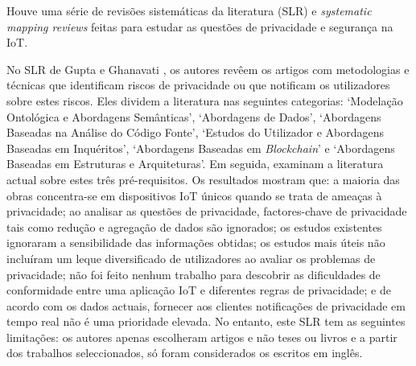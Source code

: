 \documentclass[conference]{IEEEtran}
\begin{document}
Houve uma série de revisões sistemáticas da literatura (SLR) \cite{Gupta2022Privacy, Kuhtreiber2022survey, sicari2015security, LinSurvey}
e \textit{systematic mapping reviews} \cite{porras2018security, ahmed2019aspects}
feitas para estudar as questões de privacidade e segurança na IoT.


No SLR de Gupta e Ghanavati \cite{Gupta2022Privacy}, os autores revêem os
artigos com metodologias e técnicas que identificam riscos de privacidade
ou que notificam os utilizadores sobre estes riscos. Eles dividem a literatura
nas seguintes categorias: `Modelação Ontológica e Abordagens Semânticas',
`Abordagens de Dados', `Abordagens Baseadas na Análise do Código Fonte',
`Estudos do Utilizador e Abordagens Baseadas em Inquéritos', `Abordagens
Baseadas em \textit{Blockchain}' e `Abordagens Baseadas em Estruturas e Arquiteturas'.
Em seguida, examinam a literatura actual sobre estes três pré-requisitos.
Os resultados mostram que: a maioria das obras concentra-se em dispositivos
IoT únicos quando se trata de ameaças à privacidade; ao analisar as questões
de privacidade, factores-chave de privacidade tais como redução e agregação
de dados são ignorados; os estudos existentes ignoraram a sensibilidade das
informações obtidas; os estudos mais úteis não incluíram um leque diversificado
de utilizadores ao avaliar os problemas de privacidade; não foi feito nenhum
trabalho para descobrir as dificuldades de conformidade entre uma aplicação
IoT e diferentes regras de privacidade; e de acordo com os dados actuais,
fornecer aos clientes notificações de privacidade em tempo real não é uma
prioridade elevada. No entanto, este SLR tem as seguintes limitações: os autores
apenas escolheram artigos e não teses ou livros e a partir dos trabalhos seleccionados,
só foram considerados os escritos em inglês.
\end{document}

